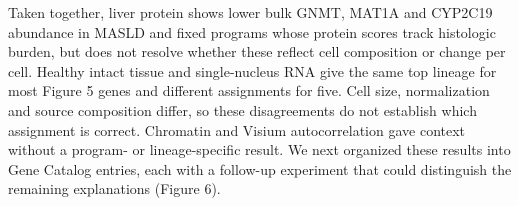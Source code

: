 Taken together, liver protein shows lower bulk GNMT, MAT1A and CYP2C19 abundance
in MASLD and fixed programs whose protein scores track histologic burden, but
does not resolve whether these reflect cell composition or change per cell.
Healthy intact tissue and single-nucleus RNA give the same top lineage for
most Figure 5 genes and different assignments for five. Cell size, normalization
and source composition differ, so these disagreements do not establish which
assignment is correct. Chromatin and Visium autocorrelation
gave context without a program- or lineage-specific result. We next organized
these results into Gene Catalog entries, each with a follow-up experiment that
could distinguish the remaining explanations (Figure 6).

